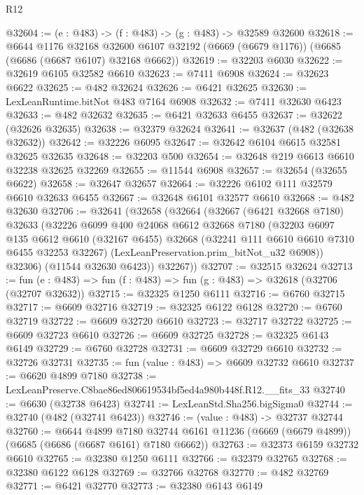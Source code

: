 \begin{lexlean}{R12}
\begin{coremodule}
@32604 := (e : @483) -> (f : @483) -> (g : @483) -> @32589 @32600
@32618 := @6644
    @1176
    @32168
    @32600
    @6107
    @32192
    (@6669 (@6679 @1176))
    (@6685 (@6686 (@6687 @6107) @32168 @6662))
@32619 := @32203 @6030
@32622 := @32619 @6105 @32582 @6610
@32623 := @7411 @6908
@32624 := @32623 @6622
@32625 := @482 @32624
@32626 := @6421 @32625
@32630 := LexLeanRuntime.bitNot @483 @7164 @6908
@32632 := @7411 @32630 @6423
@32633 := @482 @32632
@32635 := @6421 @32633 @6455
@32637 := @32622 (@32626 @32635)
@32638 := @32379 @32624
@32641 := @32637 (@482 (@32638 @32632))
@32642 := @32226 @6095
@32647 := @32642 @6104 @6615 @32581 @32625 @32635
@32648 := @32203 @500
@32654 := @32648 @219 @6613 @6610 @32238 @32625 @32269
@32655 := @11544 @6908
@32657 := @32654 (@32655 @6622)
@32658 := @32647 @32657
@32664 := @32226 @6102 @111 @32579 @6610 @32633 @6455
@32667 := @32648 @6101 @32577 @6610
@32668 := @482 @32630
@32706 := @32641
    (@32658
      (@32664
        (@32667
          (@6421 @32668 @7180)
          @32633
          (@32226
            @6099
            @400
            @24068
            @6612
            @32668
            @7180
            (@32203
              @6097
              @135
              @6612
              @6610
              (@32167 @6455)
              @32668
              (@32241 @111 @6610 @6610 @7310 @6455 @32253 @32267)
              (LexLeanPreservation.prim_bitNot_u32 @6908))
            @32306)
          (@11544 @32630 @6423))
        @32267))
@32707 := @32515 @32624
@32713 := fun (e : @483) => fun (f : @483) => fun (g : @483) => @32618 (@32706 (@32707 @32632))
@32715 := @32325 @1250 @6111
@32716 := @6760 @32715
@32717 := @6609 @32716
@32719 := @32325 @6122 @6128
@32720 := @6760 @32719
@32722 := @6609 @32720 @6610
@32723 := @32717 @32722
@32725 := @6609 @32723 @6610
@32726 := @6609 @32725
@32728 := @32325 @6143 @6149
@32729 := @6760 @32728
@32731 := @6609 @32729 @6610
@32732 := @32726 @32731
@32735 := fun (value : @483) => @6609 @32732 @6610
@32737 := @6620 @4899 @7180
@32738 := LexLeanPreserve.C8bae86ed806619534bf5ed4a980b448f.R12.__fits_33
@32740 := @6630 (@32738 @6423)
@32741 := LexLeanStd.Sha256.bigSigma0
@32744 := @32740 (@482 (@32741 @6423))
@32746 := (value : @483) -> @32737 @32744
@32760 := @6644
    @4899
    @7180
    @32744
    @6161
    @11236
    (@6669 (@6679 @4899))
    (@6685 (@6686 (@6687 @6161) @7180 @6662))
@32763 := @32373 @6159 @32732 @6610
@32765 := @32380 @1250 @6111
@32766 := @32379 @32765
@32768 := @32380 @6122 @6128
@32769 := @32766 @32768
@32770 := @482 @32769
@32771 := @6421 @32770
@32773 := @32380 @6143 @6149

\end{coremodule}
\end{lexlean}

